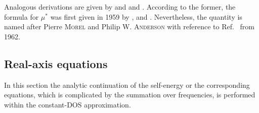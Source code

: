 Analogous derivations are given by 
\cite[185-188]{Schrieffer83} and  and 
\cite[Sec.~9]{AllenMitrovic82}. According to the former, the formula for $\mu^*$
was first given in 1959 by ,  and
 \cite[83]{BogoliubovTolmachevShirkov59}. Nevertheless, the
quantity is named after Pierre \textsc{Morel} and Philip W. \textsc{Anderson}
with reference to Ref.~ from 1962.

\subsection{Real-axis equations}

In this section the analytic continuation of the self-energy or the
corresponding  equations, which is complicated by the summation
over  frequencies, is performed within the constant-DOS
approximation.

